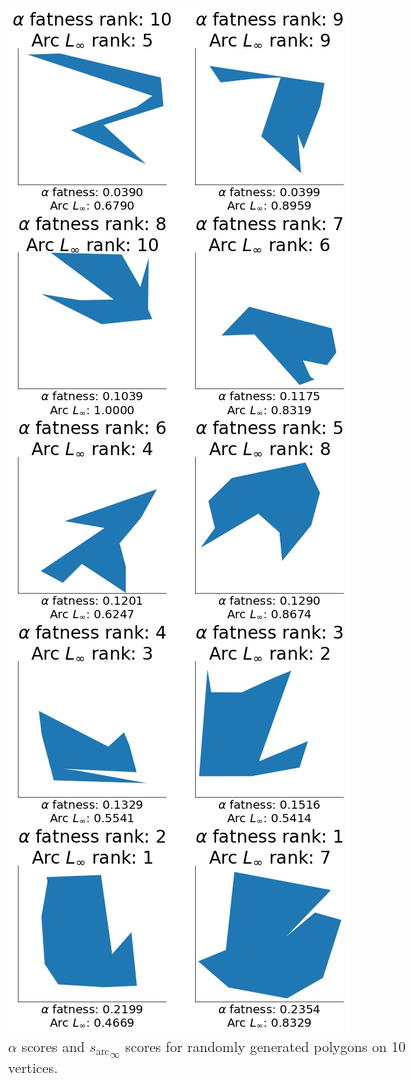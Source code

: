 \documentclass[]{jocg}
\newcommand{\chordarc}{{s_{\textrm{arc}}}}
\theoremstyle{definition}
\theoremstyle{remark}
\begin{document}
\begin{figure}[t]
  \centering
  \includegraphics[height=0.8\textheight]{../plots/u_10_alpha_score_chord_arc_infinity_vertices_0-05_delta_ranking.jpg}
  \caption{$\alpha$ scores and ${\chordarc}_{\infty}$ scores for randomly
  generated polygons on 10 vertices.}
  \label{fig:alph-inft-10}
\end{figure}
\end{document}
